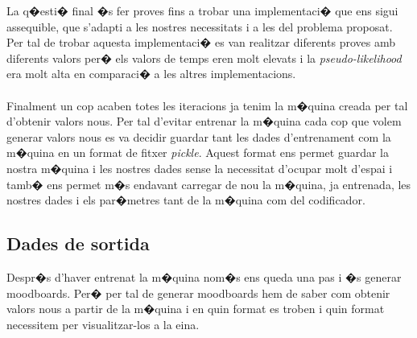 \documentclass[12pt,a4paper,openright,oneside]{article}
\numberwithin{equation}{section}
\theoremstyle{definition}
\begin{document}
La q�esti� final �s fer proves fins a trobar una implementaci� que ens sigui assequible, que s'adapti a les nostres necessitats i a les del problema proposat. Per tal de trobar aquesta implementaci� es van realitzar diferents proves amb diferents valors per� els valors de temps eren molt elevats i la \textit{pseudo-likelihood} era molt alta en comparaci� a les altres implementacions.\\\\
Finalment un cop acaben totes les iteracions ja tenim la m�quina creada per tal d'obtenir valors nous. Per tal d'evitar entrenar la m�quina cada cop que volem generar valors nous es va decidir guardar tant les dades d'entrenament com la m�quina en un format de fitxer \textit{pickle}. Aquest format ens permet guardar la nostra m�quina i les nostres dades sense la necessitat d'ocupar molt d'espai i tamb� ens permet m�s endavant carregar de nou la m�quina, ja entrenada, les nostres dades i els par�metres tant de la m�quina com del codificador.
\subsection{Dades de sortida}
Despr�s d'haver entrenat la m�quina nom�s ens queda una pas i �s generar moodboards. Per� per tal de generar moodboards hem de saber com obtenir valors nous a partir de la m�quina i en quin format es troben i quin format necessitem per visualitzar-los a la eina.
\end{document}
